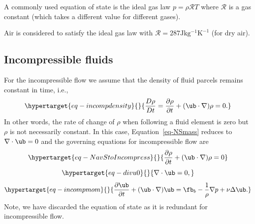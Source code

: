 \documentclass[
  letterpaper,
  twocolumn,
  landscape]{report}
\begin{document}
A commonly used equation of state is the ideal gas law
\(p=\rho \mathcal{R}T\) where \(\mathcal{R}\) is a gas constant (which
takes a different value for different gases).

\begin{tcolorbox}[enhanced jigsaw, left=2mm, opacityback=0, coltitle=black, bottomtitle=1mm, title={Example}, toprule=.15mm, colbacktitle=quarto-callout-tip-color!10!white, breakable, arc=.35mm, titlerule=0mm, colback=white, toptitle=1mm, opacitybacktitle=0.6, rightrule=.15mm, bottomrule=.15mm, colframe=quarto-callout-tip-color-frame, leftrule=.75mm]

Air is considered to satisfy the ideal gas law with
\(\mathcal{R}=287\mathrm{Jkg^{-1}K^{-1}}\) (for dry air).

\end{tcolorbox}

\hypertarget{incompressible-fluids}{%
\subsection{Incompressible fluids}\label{incompressible-fluids}}

For the incompressible flow we assume that the density of fluid parcels
remains constant in time, i.e.,
\begin{equation}\protect\hypertarget{eq-incompdensity}{}{ \frac{D\rho}{Dt}  = \frac{\partial \rho}{\partial t} + (\ub\cdot\nabla)\rho= 0. }\label{eq-incompdensity}\end{equation}
In other words, the rate of change of \(\rho\) when following a fluid
element is zero but \(\rho\) is not necessarily constant. In this case,
Equation~\ref{eq-NSmass} reduces to \(\nabla\cdot\ub = 0\) and the
governing equations for incompressible flow are
\begin{equation}\protect\hypertarget{eq-NavStoIncompress}{}{      \frac{\partial \rho}{\partial t} + (\ub\cdot\nabla)\rho = 0 }\label{eq-NavStoIncompress}\end{equation}
\begin{equation}\protect\hypertarget{eq-divu0}{}{ \nabla\cdot\ub = 0, }\label{eq-divu0}\end{equation}
\begin{equation}\protect\hypertarget{eq-incompmom}{}{ \frac{\partial\ub}{\partial t} + (\ub\cdot\nabla)\ub = \fb_b -\frac{1}{\rho}\nabla p + \nu\Delta\ub. }\label{eq-incompmom}\end{equation}
Note, we have discarded the equation of state as it is redundant for
incompressible flow.
\end{document}

